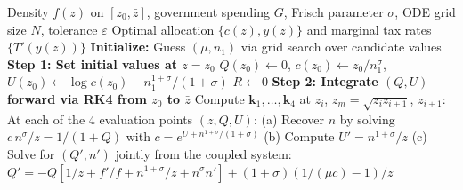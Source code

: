 \documentclass[12pt,a4paper]{article}
\theoremstyle{definition}
\theoremstyle{plain}
\theoremstyle{remark}
\newcommand{\zbar}{\bar{z}}
\newcommand{\zlow}{z_{\scriptscriptstyle 0}}
\begin{document}
\begin{algorithm}[H]
\caption{ODE Approach Using $Q$ Directly (3-State System)}\label{alg:ode_Q}
\begin{algorithmic}[1]
\Require Density $f(z)$ on $[\zlow, \zbar]$, government spending $G$, Frisch parameter $\sigma$, ODE grid size $N$, tolerance $\varepsilon$
\Ensure Optimal allocation $\{c(z), y(z)\}$ and marginal tax rates $\{T'(y(z))\}$
\Statex
\State \textbf{Initialize:} Guess $(\mu, n_1)$ via grid search over candidate values
\Statex
\Repeat
  \State \textbf{Step 1: Set initial values at $z = \zlow$}
  \Statex \hspace{\algorithmicindent}\hspace{\algorithmicindent} $Q(\zlow) \gets 0$, \quad $c(\zlow) \gets \zlow / n_1^{\sigma}$, \quad $U(\zlow) \gets \log c(\zlow) - n_1^{1+\sigma}/(1+\sigma)$
  \Statex \hspace{\algorithmicindent}\hspace{\algorithmicindent} $R \gets 0$ 
  \Statex
  \State \textbf{Step 2: Integrate $(Q, U)$ forward via RK4 from $\zlow$ to $\zbar$}
    \State Compute $\mathbf{k}_1, \ldots, \mathbf{k}_4$ at $z_i$, $z_m = \sqrt{z_i z_{i+1}}$, $z_{i+1}$:
    \Statex \hspace{\algorithmicindent}\hspace{\algorithmicindent}\hspace{\algorithmicindent} At each of the 4 evaluation points $(z, Q, U)$:
    \Statex \hspace{\algorithmicindent}\hspace{\algorithmicindent}\hspace{\algorithmicindent} (a) Recover $n$ by solving $c\,n^{\sigma}/z = 1/(1+Q)$ with $c = e^{U + n^{1+\sigma}/(1+\sigma)}$
    \Statex \hspace{\algorithmicindent}\hspace{\algorithmicindent}\hspace{\algorithmicindent} (b) Compute $U' = n^{1+\sigma}/z$ 
    \Statex \hspace{\algorithmicindent}\hspace{\algorithmicindent}\hspace{\algorithmicindent} (c) Solve for $(Q', n')$ jointly from the coupled system:
    \Statex \hspace{\algorithmicindent}\hspace{\algorithmicindent}\hspace{\algorithmicindent}\hspace{\algorithmicindent} $Q' = -Q[1/z + f'/f + n^{1+\sigma}/z + n^{\sigma}n'] + (1+\sigma)(1/(\mu c) - 1)/z$

\end{algorithmic}
\end{algorithm}
\end{document}
